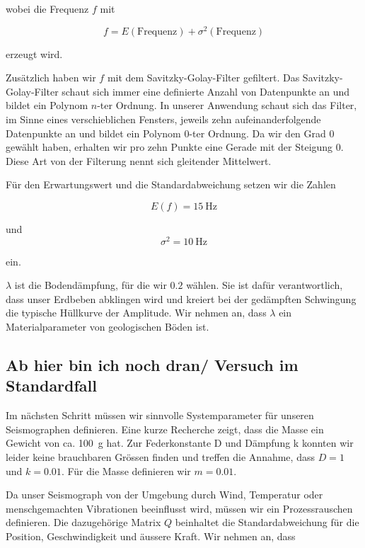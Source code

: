 wobei die Frequenz $f$ mit

\begin{equation}
	f = E(\mathrm{Frequenz}) + \sigma^2(\mathrm{Frequenz})
\end{equation}

erzeugt wird.

Zusätzlich haben wir $f$ mit dem Savitzky-Golay-Filter gefiltert.
Das Savitzky-Golay-Filter schaut sich immer eine definierte Anzahl von Datenpunkte an
und bildet ein Polynom $n$-ter Ordnung.
In unserer Anwendung schaut sich das Filter, im Sinne eines verschieblichen Fensters,
jeweils zehn aufeinanderfolgende Datenpunkte an und bildet ein Polynom $0$-ter Ordnung.
Da wir den Grad $0$ gewählt haben, erhalten wir pro zehn Punkte eine Gerade mit der Steigung $0$.
Diese Art von der Filterung nennt sich gleitender Mittelwert.

Für den Erwartungswert und die Standardabweichung setzen wir die Zahlen

\begin{equation}
E(f) = \SI{15}{\hertz}
\end{equation}

und
\begin{equation}
\sigma^2 = \SI{10}{\hertz}
\end{equation}

ein.

$\lambda$ ist die Bodendämpfung, für die wir $0.2$ wählen.
Sie ist dafür verantwortlich, dass unser Erdbeben abklingen wird und kreiert bei der gedämpften Schwingung die typische Hüllkurve der Amplitude.
Wir nehmen an, dass $\lambda$ ein Materialparameter von geologischen Böden ist.

\subsection{Ab hier bin ich noch dran/ Versuch im Standardfall}
Im nächsten Schritt müssen wir sinnvolle Systemparameter für unseren Seismographen definieren.
Eine kurze Recherche zeigt, dass die Masse ein Gewicht von ca. \SI{100}{\gram} hat.
Zur Federkonstante D und Dämpfung k konnten wir leider keine brauchbaren Grössen finden und treffen die Annahme, dass $D = 1$ und $k = 0.01$.
Für die Masse definieren wir $m = 0.01$.

Da unser Seismograph von der Umgebung durch Wind, Temperatur oder menschgemachten Vibrationen beeinflusst wird, müssen wir ein Prozessrauschen definieren.
Die dazugehörige Matrix $Q$ beinhaltet die Standardabweichung für die Position, Geschwindigkeit und äussere Kraft.
Wir nehmen an, dass

